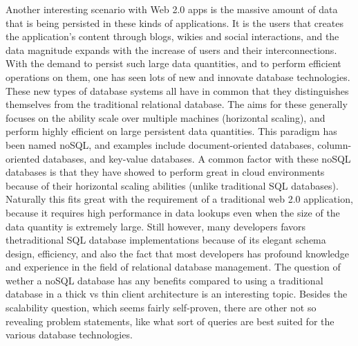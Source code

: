 
Another interesting scenario with Web 2.0 apps is the massive amount of data that is being persisted in these kinds of applications. It is the users that creates the application's content through blogs, wikies and social interactions, and the data magnitude expands with the increase of users and their interconnections. With the demand to persist such large data quantities, and to perform efficient operations on them, one has seen lots of new and innovate database technologies. These new types of database systems all have in common that they distinguishes themselves from the traditional relational database. The aims for these generally focuses on the ability scale over multiple machines (horizontal scaling), and perform highly efficient on large persistent data quantities. This paradigm has been named noSQL, and examples include document-oriented databases, column-oriented databases, and key-value databases. A common factor with these noSQL databases is that they have showed to perform great in cloud environments because of their horizontal scaling abilities (unlike traditional SQL databases). Naturally this fits great with the requirement of a traditional web 2.0 application, because it requires high performance in data lookups even when the size of the data quantity is extremely large. Still however, many developers favors thetraditional SQL database implementations because of its elegant schema design, efficiency, and also the fact that most developers has profound knowledge and experience in the field of relational database management. The question of wether a noSQL database has any benefits compared to using a traditional database in a thick vs thin client architecture is an interesting topic. Besides the scalability question, which seems fairly self-proven, there are other not so revealing problem statements, like what sort of queries are best suited for the various database technologies.

